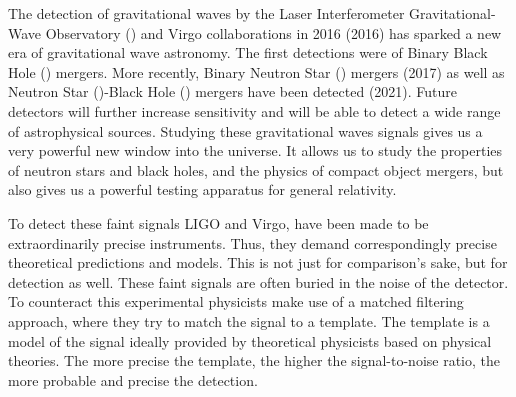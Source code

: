 \documentclass[
  letterpaper,
  DIV=11,
  numbers=noendperiod,
  oneside]{scrreprt}
\begin{document}
The detection of gravitational waves by the
Laser Interferometer Gravitational-Wave Observatory () and Virgo
collaborations in 2016
(2016)
has sparked a new era of gravitational wave astronomy. The first
detections were of Binary Black Hole () mergers. More recently,
Binary Neutron Star () mergers
(2017)
as well as Neutron Star ()-Black Hole () mergers have been detected
(2021).
Future detectors will further increase sensitivity and will be able to
detect a wide range of astrophysical sources. Studying these
gravitational waves signals gives us a very powerful new window into the
universe. It allows us to study the properties of neutron stars and
black holes, and the physics of compact object mergers, but also gives
us a powerful testing apparatus for general relativity.

To detect these faint signals {LIGO} and Virgo, have been made to be
extraordinarily precise instruments. Thus, they demand correspondingly
precise theoretical predictions and models. This is not just for
comparison's sake, but for detection as well. These faint signals are
often buried in the noise of the detector. To counteract this
experimental physicists make use of a matched filtering approach, where
they try to match the signal to a template. The template is a model of
the signal ideally provided by theoretical physicists based on physical
theories. The more precise the template, the higher the signal-to-noise
ratio, the more probable and precise the detection.
\end{document}
